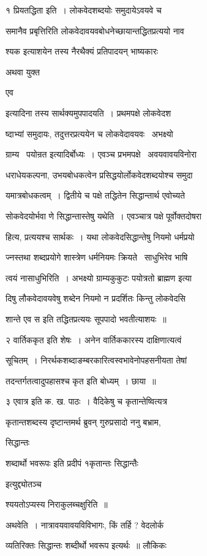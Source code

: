 \documentclass[11pt, openany]{book}
\begin{document}
१ प्रियतद्धिता इति~। लोकवेदशब्दयोः समुदायेऽवयवे च 

समानैव प्रबृत्तिरिति लोकवेदावयवबोधनेच्छायान्तद्धितप्रत्ययो नाव \textendash\ 

श्यक इत्याशयेन तस्य नैरथैक्यं प्रतिपादयन् भाष्यकारः {\qt अथवा युक्त 

एव} इत्यादिना तस्य सार्थक्यमुपपादयति~। प्रथमपक्षे लोकवेदश \textendash\ 

ष्दाभ्यां समुदायः, तदुत्तरप्रत्ययेन च लोकवेदावयवः \textendash\ अभक्ष्यो 

ग्राम्य \textendash\ पयोन्रत इत्यादिर्बोध्यः~। एवञ्च प्रभमपक्षे \textendash\ अवयवावयविनोरा \textendash\ 

धराधेयकल्पना, उभयबोधकत्वेन प्रसिद्धयोर्लोकवेदशब्दयोश्च समुदा \textendash\ 

यमात्रबोधकत्वम्~। द्वितीये च पक्षे तद्धितेन सिद्धान्तार्थ एवोच्यते \textendash\ 

सोकवेदयोर्भवा णे सिद्धान्तास्तेषु यथेति~। एवञ्चात्र पक्षे
पूर्वोक्तदोषरा \textendash\ 

हित्य, प्रत्ययश्च सार्थकः~। यथा लोकवेदसिद्धान्तेषु नियमो धर्मप्रयो \textendash\ 

ज्नस्तथा शब्दप्रयोगे शास्त्रेण धर्मनियमः क्रियते \textendash\ साधुभिरेव भाषि \textendash\ 

त्वयं नासाधुभिरिति~। अभक्ष्यो ग्राम्यकुकुटः पयोत्रतो ब्राह्मण इत्या \textendash\ 

दिषु लौकवेदावयवेषु शब्देन नियमो न प्रदर्शितः किन्तु लोकवेदसि \textendash\ 

शान्ते एव स इति तद्धितप्रत्ययः सूपपादो भवतीत्याशयः~॥ 

२ वार्तिककृत इति शेषः~। अनेन वार्तिककारस्य दाक्षिणात्यत्वं 

सूचितम्~। निरर्थकशब्दाङम्बरकारित्वस्वभावेनोपहसनीयता तेषां 

तदन्तर्गतत्वादुपहासश्च कृत इति बोध्यम्~। छाया~॥ 

३ {\qt एवात्र} इति क. ख. पाठः~। वैदिकेषु च कृतान्तेष्वित्यत्र 

कृतान्तशब्दस्य दृष्टान्तमर्थ ब्रुवन् गुरुप्रसादो ननु बभ्राम,
{\qt सिद्धान्तः 

शब्दार्थो भवरूपः इति प्रदीपं १कृतान्तः सिद्धान्तैः} इत्युद्द्योतञ्च 

श्ययतोऽप्यस्य निराकुलब्चक्षुरिति~॥ 





अथवेति~। नात्रावयवावयविविभागः, किं तर्हि ? वेदलोर्क \textendash\ 

व्यतिरिक्तः सिद्धान्तः शब्दीर्थो भवरूप इत्यर्थः~॥ लौकिकः \textendash\ 
\end{document}
